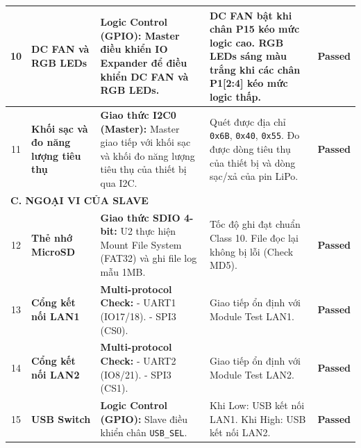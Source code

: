 \begin{longtable}{|c|p{}|p{}|p{}|c|}
                    10 & \textbf{DC FAN và RGB LEDs} & \textbf{Logic Control (GPIO):} \newline Master điều khiển IO Expander để điều khiển DC FAN và RGB LEDs. & DC FAN bật khi chân P15 kéo mức logic cao. RGB LEDs sáng màu trắng khi các chân P1[2:4] kéo mức logic thấp. & \textcolor{modern_blue}{\textbf{Passed}} \\ \hline
        
                    11 & \textbf{Khối sạc và đo năng lượng tiêu thụ} & \textbf{Giao thức I2C0 (Master):} \newline Master giao tiếp với khối sạc và khối đo năng lượng tiêu thụ của thiết bị qua I2C. & Quét được địa chỉ \texttt{0x6B}, \texttt{0x40}, \texttt{0x55}. Đo được dòng tiêu thụ của thiết bị và dòng sạc/xả của pin LiPo. & \textcolor{modern_blue}{\textbf{Passed}} \\ \hline
        
                    \multicolumn{5}{|l|}{\textbf{C. NGOẠI VI CỦA SLAVE}} \\ \hline
        
                    12 & \textbf{Thẻ nhớ MicroSD} & \textbf{Giao thức SDIO 4-bit:} \newline U2 thực hiện Mount File System (FAT32) và ghi file log mẫu 1MB. & Tốc độ ghi đạt chuẩn Class 10. File đọc lại không bị lỗi (Check MD5). & \textcolor{modern_blue}{\textbf{Passed}} \\ \hline
        
                    13 & \textbf{Cổng kết nối LAN1} & \textbf{Multi-protocol Check:} \newline - UART1 (IO17/18). \newline - SPI3 (CS0). & Giao tiếp ổn định với Module Test LAN1. & \textcolor{modern_blue}{\textbf{Passed}} \\ \hline
        
                    14 & \textbf{Cổng kết nối LAN2} & \textbf{Multi-protocol Check:} \newline - UART2 (IO8/21). \newline - SPI3 (CS1). & Giao tiếp ổn định với Module Test LAN2. & \textcolor{modern_blue}{\textbf{Passed}} \\ \hline
        
                    15 & \textbf{USB Switch} & \textbf{Logic Control (GPIO):} \newline Slave điều khiển chân \texttt{USB\_SEL}. & Khi Low: USB kết nối LAN1. Khi High: USB kết nối LAN2. & \textcolor{modern_blue}{\textbf{Passed}} \\ \hline
        

\end{longtable}
